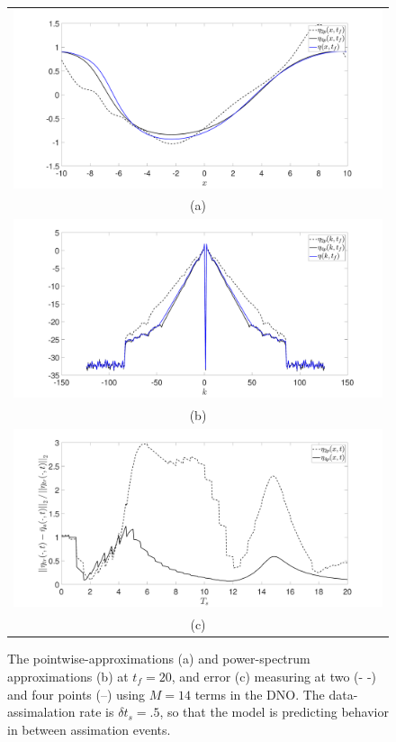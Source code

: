 \begin{figure}[!h]
	\begin{tabular}{c}
		\includegraphics[width=.8\textwidth]{./Images/pwise_sig_pt1_srate_pt5_Nens_200_Np_4_tf_20_M_14}\\
		(a)\\
		\includegraphics[width=.8\textwidth]{./Images/pspec_sig_pt1_srate_pt5_Nens_200_Np_4_tf_20_M_14}\\
		(b)\\
		\includegraphics[width=.8\textwidth]{./Images/error_sig_pt1_srate_pt5_Nens_200_Np_4_tf_20_M_14}\\
		(c)	
	\end{tabular}	
	\caption{The pointwise-approximations (a) and power-spectrum approximations (b) at $t_{f}=20$, and error (c) measuring at two (- -) and four points (--) using $M=14$ terms in the DNO.  The data-assimalation rate is $\delta t_{s}=.5$, so that the model is predicting behavior in between assimation events.}
	\label{fig:dno_14}
\end{figure}

